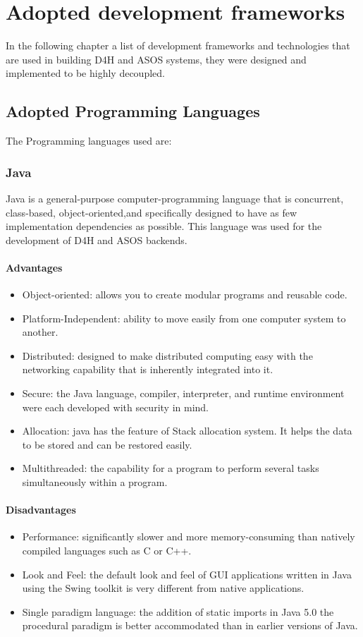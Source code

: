 \documentclass[a4paper, hidelinks, 12pt]{report}
\begin{document}
	\chapter{Adopted development frameworks}
In the following chapter a list of development frameworks and technologies that are used in building  D4H and ASOS systems, they were designed and implemented to be highly decoupled.

	\section{Adopted Programming Languages}
	The Programming languages used are:
	
	\subsection{Java} Java is a general-purpose computer-programming language that is concurrent, class-based, object-oriented,and specifically designed to have as few implementation dependencies as possible. This language was used for the development of D4H and ASOS backends.
	
	\subsubsection{Advantages}
	\begin{itemize}
	\item{Object-oriented}: allows you to create modular programs and reusable code. 
	\item{Platform-Independent}: ability to move easily from one computer system to another. 
		\item{Distributed}: designed to make distributed computing easy with the networking capability that is inherently integrated into it.
		\item{Secure}: the Java language, compiler, interpreter, and runtime environment were each developed with security in mind.
		\item{Allocation}: java has the feature of Stack allocation system. It helps the data to be stored and can be restored easily.
		\item{Multithreaded}: the capability for a program to perform several tasks simultaneously within a program.
	\end{itemize}
	
	\subsubsection{Disadvantages}
	\begin{itemize}
	\item{Performance}: significantly slower and more memory-consuming than natively compiled languages such as C or C++.
	\item{Look and Feel}: the default look and feel of GUI applications written in Java using the Swing toolkit is very different from native applications.
		\item{Single paradigm language}: the addition of static imports in Java 5.0 the procedural paradigm is better accommodated than in earlier versions of Java.
	\end{itemize}
	
\end{document}
